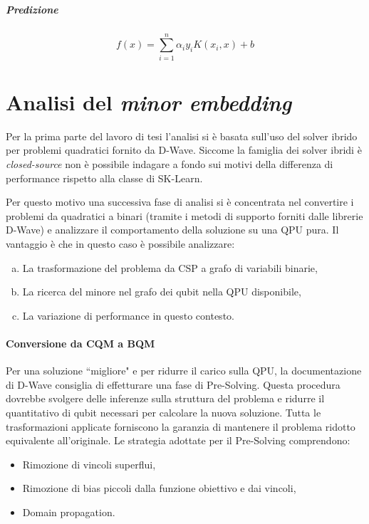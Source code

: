 \documentclass[12pt]{article}
\begin{document}
\subparagraph{Predizione}

$$f(x)=\sum_{i=1}^n\alpha_iy_iK(x_i, x) + b$$

\section{Analisi del \emph{minor embedding}}

Per la prima parte del lavoro di tesi l'analisi si è basata sull'uso del solver ibrido per problemi quadratici fornito da D-Wave.
Siccome la famiglia dei solver ibridi è \emph{closed-source} non è possibile indagare a fondo sui motivi della differenza di performance rispetto alla classe di SK-Learn.

Per questo motivo una successiva fase di analisi si è concentrata nel convertire i problemi da quadratici a binari (tramite i metodi di supporto forniti dalle librerie D-Wave) e analizzare il comportamento della soluzione su una QPU pura.
Il vantaggio è che in questo caso è possibile analizzare:
\begin{enumerate}[a)]
  \item La trasformazione del problema da CSP a grafo di variabili binarie,
  \item La ricerca del minore nel grafo dei qubit nella QPU disponibile,
  \item La variazione di performance in questo contesto.
\end{enumerate}

\paragraph{Conversione da CQM a BQM}

Per una soluzione “migliore" e per ridurre il carico sulla QPU, la documentazione di D-Wave consiglia di effetturare una fase di Pre-Solving.
Questa procedura dovrebbe svolgere delle inferenze sulla struttura del problema e ridurre il quantitativo di qubit necessari per calcolare la nuova soluzione.
Tutta le trasformazioni applicate forniscono la garanzia di mantenere il problema ridotto equivalente all'originale.
Le strategia adottate per il Pre-Solving comprendono:
\begin{itemize}
  \item Rimozione di vincoli superflui,
  \item Rimozione di bias piccoli dalla funzione obiettivo e dai vincoli,
  \item Domain propagation.
\end{itemize}
\end{document}
